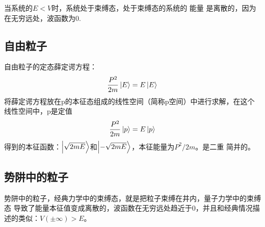 \documentclass[UTF8]{article}
\numberwithin{equation}{section}
\begin{document}
\begin{tcolorbox}[colframe=green,title = 束缚态的定义]
    当系统的$E<V$时，系统处于束缚态，处于束缚态的系统的
    能量
是离散的，因为在无穷远处，波函数为0.
\end{tcolorbox}

\subsection{自由粒子}
自由粒子的定态薛定谔方程：
\begin{align*}
    \frac{P^2}{2m}\ket{E}=E\ket{E}
\end{align*}
将薛定谔方程放在p的本征态组成的线性空间（简称p空间）中进行求解，在这个线性空间中，p是定值
\begin{align*}
    \frac{P^2}{2m}\ket{p}=E\ket{p}
\end{align*}
得到的本征函数：$\ket{\sqrt{2mE}}$和$\ket{-\sqrt{2mE}}$，本征能量为$P^2/2m$。是二重
简并的。
\subsection{势阱中的粒子}
势阱中的粒子，经典力学中的束缚态，就是把粒子束缚在井内，量子力学中的束缚态
导致了能量本征值变成离散的，波函数在无穷远处趋近于0，并且和经典情况描述的类似：$
    V(\pm \infty)>E$。
\end{document}
